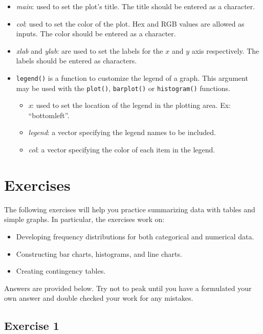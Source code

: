 \documentclass[
  letterpaper,
  DIV=11,
  numbers=noendperiod]{scrreprt}
\providecommand{\tightlist}{%
  \setlength{\itemsep}{0pt}\setlength{\parskip}{0pt}}\usepackage{longtable,booktabs,array}
\begin{document}
\begin{itemize}
\tightlist
\item
  \emph{main}: used to set the plot's title. The title should be entered
  as a character.
\item
  \emph{col}: used to set the color of the plot. Hex and RGB values are
  allowed as inputs. The color should be entered as a character.
\item
  \emph{xlab} and \emph{ylab}: are used to set the labels for the \(x\)
  and \(y\) axis respectively. The labels should be entered as
  characters.
\item
  \texttt{legend()} is a function to customize the legend of a graph.
  This argument may be used with the \texttt{plot()}, \texttt{barplot()}
  or \texttt{histogram()} functions.

  \begin{itemize}
  \tightlist
  \item
    \emph{x}: used to set the location of the legend in the plotting
    area. Ex: ``bottomleft''.
  \item
    \emph{legend}: a vector specifying the legend names to be included.
  \item
    \emph{col}: a vector specifying the color of each item in the
    legend.
  \end{itemize}
\end{itemize}

\hypertarget{exercises-1}{%
\section{Exercises}\label{exercises-1}}

The following exercises will help you practice summarizing data with
tables and simple graphs. In particular, the exercises work on:

\begin{itemize}
\item
  Developing frequency distributions for both categorical and numerical
  data.
\item
  Constructing bar charts, histograms, and line charts.
\item
  Creating contingency tables.
\end{itemize}

Answers are provided below. Try not to peak until you have a formulated
your own answer and double checked your work for any mistakes.

\hypertarget{exercise-1-2}{%
\subsection*{Exercise 1}\label{exercise-1-2}}
\end{document}
